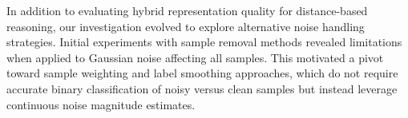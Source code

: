 
In addition to evaluating hybrid representation quality for distance-based reasoning, our investigation evolved to explore alternative noise handling strategies. Initial experiments with sample removal methods revealed limitations when applied to Gaussian noise affecting all samples. This motivated a pivot toward sample weighting and label smoothing approaches, which do not require accurate binary classification of noisy versus clean samples but instead leverage continuous noise magnitude estimates.

